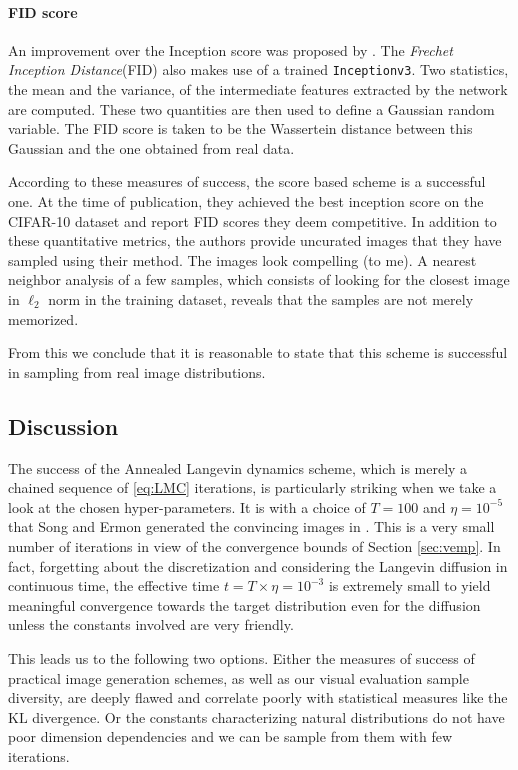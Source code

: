 \documentclass[10pt,journal,a4paper]{IEEEtran}
\theoremstyle{definition}
\newcommand{\KL}{\text{KL}}
\begin{document}
\paragraph{FID score}  An improvement over the Inception score was proposed by \cite{heusel_gans_2017}. The \textit{Frechet Inception Distance}(FID) also makes use of a trained \texttt{Inceptionv3}. Two statistics, the mean and the variance, of the intermediate features extracted by the network are computed. These two quantities are then used to define a Gaussian random variable. The FID score is taken to be the Wassertein distance between this Gaussian and the one obtained from real data.

According to these measures of success, the score based scheme is a successful one. At the time of publication, they achieved the best inception score on the CIFAR-10 dataset and report FID scores they deem competitive. In addition to these quantitative metrics, the authors provide uncurated images that they have sampled using their method. The images look compelling (to me). A nearest neighbor analysis of a few samples, which consists of looking for the closest image in $\ell_2$ norm in the training dataset, reveals that the samples are not merely memorized.

From this we conclude that it is reasonable to state that this scheme is successful in sampling from real image distributions.

\subsection{Discussion}

 
The success of the Annealed Langevin dynamics scheme, which is merely a chained sequence of \eqref{eq:LMC} iterations, is particularly striking when we take a look at the chosen hyper-parameters. It is with a choice of $T=100$ and $\eta = 10^{-5}$ that Song and Ermon generated the convincing images in \cite{song_generative_2019}. This is a very small number of iterations in view of the convergence bounds of Section \ref{sec:vemp}. In fact, forgetting about the discretization and considering the Langevin diffusion in continuous time, the effective time $t = T \times \eta = 10^{-3}$ is extremely small to yield meaningful convergence towards the target distribution even for the diffusion unless the constants involved are very friendly. 

This leads us to the following two options. Either the measures of success of practical image generation schemes, as well as our visual evaluation sample diversity, are deeply flawed and correlate poorly with statistical measures like the $\KL$ divergence. Or the constants characterizing natural distributions do not have poor dimension dependencies and we can be sample from them with few iterations.
\end{document}
